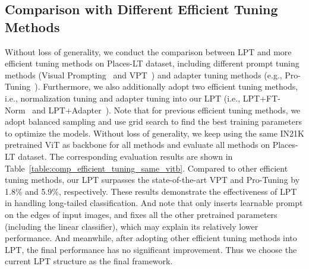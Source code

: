 \documentclass{article} \usepackage{iclr2023_conference,times}
\begin{document}
\begin{table}
\centering
   \caption{Fair comparison with different efficient tuning methods on Places-LT dataset. All methods start from the same IN21K pretrained ViT-B feature extractor. Quantitative results show that LPT achieves the best accuracy.}
\setlength{\tabcolsep}{13.6pt} \renewcommand{\arraystretch}{3.5}{ \fontsize{8.3}{3}}
   \label{table:comp_efficient_tuning_same_vitb}
\end{table}

\subsection{Comparison with Different Efficient Tuning Methods}\label{sec:comp_efficient_tuning}
Without loss of generality, we conduct the comparison between LPT and more efficient tuning methods on Places-LT dataset, including different prompt tuning methods (Visual Prompting~\citep{bahng2022exploring} and VPT~\citep{jia2022vpt}) and adapter tuning methods (e.g., Pro-Tuning~\citep{nie2022protuning}). Furthermore, we also additionally adopt two efficient tuning methods, i.e., normalization tuning and adapter tuning into our LPT (i.e., LPT+FT-Norm~\citep{frankle2021training} and LPT+Adapter~\citep{nie2022protuning}). 
Note that for previous efficient tuning methods, we adopt balanced sampling and use grid search to find the best training parameters to optimize the models. 
Without loss of generality, we keep using the same IN21K pretrained ViT as backbone for all methods and evaluate all methods on Places-LT dataset. 
The corresponding evaluation results are shown in Table~\ref{table:comp_efficient_tuning_same_vitb}. Compared to other efficient tuning methods, our LPT surpasses the state-of-the-art VPT and Pro-Tuning by 1.8\% and 5.9\%, respectively. These results demonstrate the effectiveness of LPT in handling long-tailed classification. And note that \citet{bahng2022exploring} only inserts learnable prompt on the edges of input images, and fixes all the other pretrained parameters (including the linear classifier), which may explain its relatively lower performance. And meanwhile, after adopting other efficient tuning methods into LPT, the final performance has no significant improvement. Thus we choose the current LPT structure as the final framework.
\end{document}
